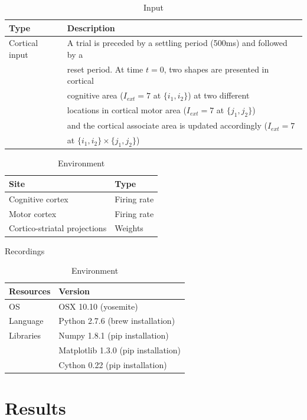\begin{table}[htbp]
\small \sffamily \centering
\begin{tabular}{ll}
\bf Type & \bf Description\\
\hline
Cortical input & A trial is preceded by a settling period (500ms) and
followed by a\\
& reset period. At time \(t=0\), two shapes are presented in
cortical\\
& cognitive area (\(I_{ext}=7\) at \(\{i_1,i_2\}\)) at two
different\\
& locations in cortical motor area (\(I_{ext}=7\) at
\(\{j_1,j_2\}\))\\
& and the cortical associate area is updated accordingly
(\(I_{ext}=7\)\\
& at \(\{i_1,i_2\}\times\{j_1,j_2\}\))\\
\hline
\end{tabular}
\caption{Input}
\end{table}


\begin{table}[htbp]
  \parbox{.45\linewidth}{
\small \sffamily \centering
\begin{tabular}{ll}
\bf Site & \bf Type\\
\hline
Cognitive cortex             & Firing rate\\
Motor cortex                 & Firing rate\\
Cortico-striatal projections & Weights\\
\hline
\end{tabular}
\caption{Recordings}
}
\hfill
\parbox{.45\linewidth}{
\small \sffamily \centering
\begin{tabular}{ll}
\bf Resources & \bf Version\\
\hline
OS        & OSX 10.10 (yosemite)\\
Language  & Python 2.7.6 (brew installation)\\
Libraries & Numpy 1.8.1 (pip installation)\\
          & Matplotlib 1.3.0 (pip installation)\\
          & Cython 0.22 (pip installation)\\
\hline
\end{tabular}
\caption{Environment}
}
\end{table}


\section*{Results}


